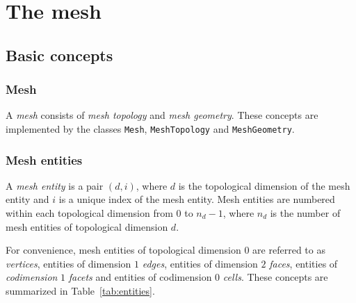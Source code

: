 \chapter{The mesh}



\newpage

\section{Basic concepts}

\subsection{Mesh}

A \emph{mesh} consists of \emph{mesh topology} and \emph{mesh geometry}.
These concepts are implemented by the classes \texttt{Mesh},
\texttt{MeshTopology} and \texttt{MeshGeometry}.

\subsection{Mesh entities}

A \emph{mesh entity} is a pair $(d, i)$, where $d$ is the topological
dimension of the mesh entity and $i$ is a unique index of the mesh
entity. Mesh entities are numbered within each topological dimension
from $0$ to $n_d-1$, where $n_d$ is the number of mesh entities of
topological dimension $d$.

For convenience, mesh entities of topological dimension $0$ are
referred to as \emph{vertices}, entities of dimension $1$
\emph{edges}, entities of dimension $2$ \emph{faces}, entities of
\emph{codimension} $1$ \emph{facets} and entities of codimension $0$
\emph{cells}. These concepts are summarized in
Table~\ref{tab:entities}.

